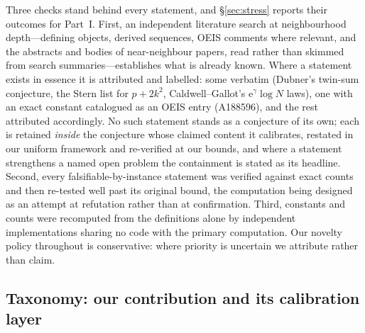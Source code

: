 \documentclass[11pt]{article}
\theoremstyle{definition}
\newcommand{\e}{\mathrm{e}}
\begin{document}
Three checks stand behind every statement, and \S\ref{sec:stress}
reports their outcomes for Part~I.  First, an independent literature
search at neighbourhood depth---defining objects, derived sequences,
OEIS comments where relevant, and the abstracts and bodies of
near-neighbour papers, read rather than skimmed from search
summaries---establishes what is already known.  Where a statement exists
in essence it is attributed and labelled: some verbatim (Dubner's
twin-sum conjecture, the Stern list for $p+2k^2$, Caldwell--Gallot's
$\e^{\gamma}\log N$ laws), one with an exact constant catalogued as an
OEIS entry (A188596), and the rest attributed accordingly.  No such
statement stands as a conjecture of its own; each is retained \emph{inside} the
conjecture whose claimed content it calibrates, restated in our uniform
framework and re-verified at our bounds, and where a statement
strengthens a named open problem the containment is stated as its
headline.  Second, every falsifiable-by-instance statement was verified
against exact counts and then re-tested well past its original bound,
the computation being designed as an attempt at refutation rather than
at confirmation.  Third, constants and counts were recomputed from the
definitions alone by independent implementations sharing no code with
the primary computation.  Our novelty policy throughout is conservative:
where priority is uncertain we attribute rather than claim.

\subsection*{Taxonomy: our contribution and its calibration layer}
\end{document}
